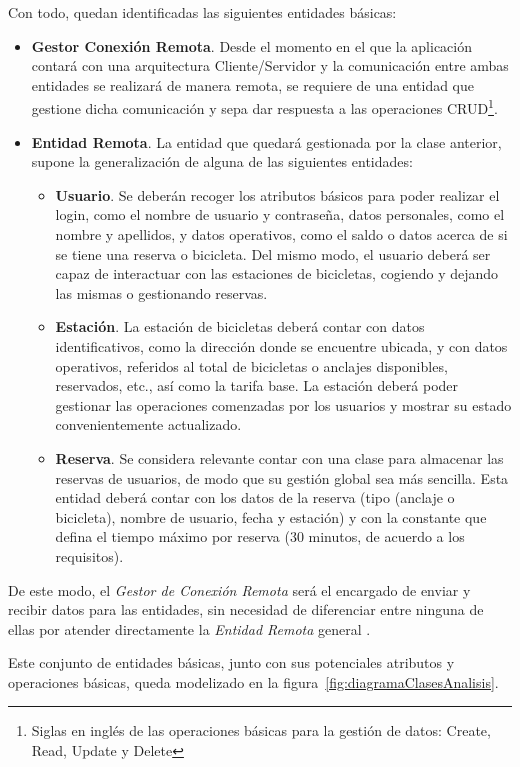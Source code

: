 Con todo, quedan identificadas las siguientes entidades básicas:

\begin{itemize}
	\item \textbf{Gestor Conexión Remota}. Desde el momento en el que la aplicación contará con una arquitectura Cliente/Servidor y la comunicación entre ambas entidades se realizará de manera remota, se requiere de una entidad que gestione dicha comunicación y sepa dar respuesta a las operaciones CRUD\footnote{Siglas en inglés de las operaciones básicas para la gestión de datos: Create, Read, Update y Delete}.
	\item \textbf{Entidad Remota}. La entidad que quedará gestionada por la clase anterior, supone la generalización de alguna de las siguientes entidades:
	\begin{itemize}
		\item \textbf{Usuario}. Se deberán recoger los atributos básicos para poder realizar el login, como el nombre de usuario y contraseña, datos personales, como el nombre y apellidos, y datos operativos, como el saldo o datos acerca de si se tiene una reserva o bicicleta. Del mismo modo, el usuario deberá ser capaz de interactuar con las estaciones de bicicletas, cogiendo y dejando las mismas o gestionando reservas.
		\item \textbf{Estación}. La estación de bicicletas deberá contar con datos identificativos, como la dirección donde se encuentre ubicada, y con datos operativos, referidos al total de bicicletas o anclajes disponibles, reservados, etc., así como la tarifa base. La estación deberá poder gestionar las operaciones comenzadas por los usuarios y mostrar su estado convenientemente actualizado.
		\item \textbf{Reserva}. Se considera relevante contar con una clase para almacenar las reservas de usuarios, de modo que su gestión global sea más sencilla. Esta entidad deberá contar con los datos de la reserva (tipo (anclaje o bicicleta), nombre de usuario, fecha y estación) y con la constante que defina el tiempo máximo por reserva (30 minutos, de acuerdo a los requisitos).
	\end{itemize}
\end{itemize}

De este modo, el \emph{Gestor de Conexión Remota} será el encargado de enviar y recibir datos para las entidades, sin necesidad de diferenciar entre ninguna de ellas por atender directamente la \emph{Entidad Remota} general .

Este conjunto de entidades básicas, junto con sus potenciales atributos y operaciones básicas, queda modelizado en la figura~\ref{fig:diagramaClasesAnalisis}.

